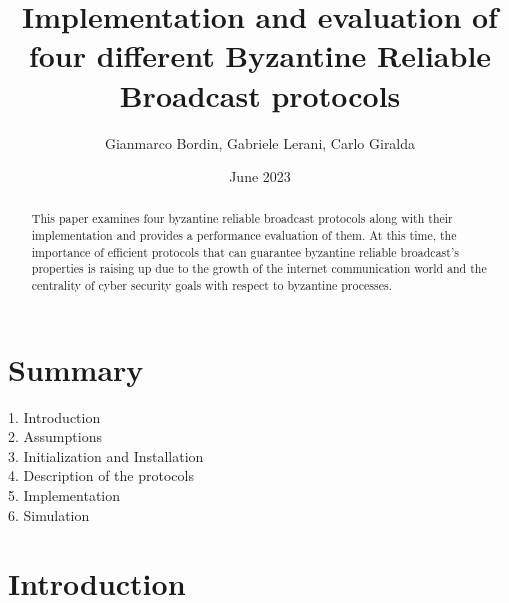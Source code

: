 \documentclass[12pt]{article}
\title{Implementation and evaluation of four different Byzantine Reliable Broadcast protocols}
\author{Gianmarco Bordin, Gabriele Lerani, Carlo Giralda}
\affil{Department of Engineering in Computer Science, \\ Sapienza Università di Roma}
\date{June 2023}
\begin{document}
\maketitle
\begin{abstract}
This paper examines four byzantine reliable broadcast protocols along with their implementation and provides a performance evaluation of them. At this time, the importance of efficient protocols that can guarantee byzantine reliable broadcast's properties is raising up due to the growth of the internet communication world and the centrality of cyber security goals with respect to byzantine processes. 
\end{abstract}

\newpage

\section{Summary}

1. Introduction\\
2. Assumptions\\
3. Initialization and Installation\\
4. Description of the protocols\\
5. Implementation\\
6. Simulation

\newpage

\section{Introduction}
\end{document}
